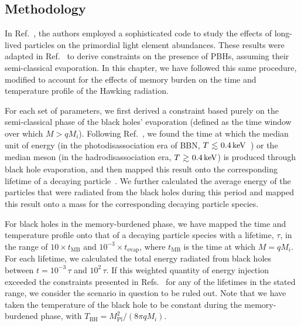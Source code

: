 \begin{subappendices}

\section{Methodology}
\label{sec:ch10-app-methodology}

In Ref.~\cite{Kawasaki:2017bqm}, the authors employed a sophisticated code to study the effects of long-lived particles on the primordial light element abundances. These results were adapted in Ref.~\cite{Keith:2020jww} to derive constraints on the presence of PBHs, assuming their semi-classical evaporation.  In this chapter, we have followed this same procedure, modified to account for the effects of memory burden on the time and temperature profile of the Hawking radiation.

For each set of parameters, we first derived a constraint based purely on the semi-classical phase of the black holes' evaporation (defined as the time window over which $M > q M_{i}$). Following Ref.~\cite{Keith:2020jww}, we found the time at which the median unit of energy (in the photodisassociation era of BBN, $T \lsim 0.4\,\mathrm{keV}$~\cite{Kawasaki:1994af}) or the median meson (in the hadrodisassociation era, $T \gsim 0.4\,\mathrm{keV}$) is produced through black hole evaporation, and then mapped this result onto the corresponding lifetime of a decaying particle~\cite{Kawasaki:1994af}. We further calculated the average energy of the particles that were radiated from the black holes during this period and mapped this result onto a mass for the corresponding decaying particle species.

For black holes in the memory-burdened phase, we have mapped the time and temperature profile onto that of a decaying particle species with a lifetime, $\tau$, in the range of $10 \times t_\mathrm{MB}$ and $10^{-3} \times t_\mathrm{evap}$, where $t_\mathrm{MB}$ is the time at which $M=q M_{i}$. For each lifetime, we calculated the total energy radiated from black holes between $t= 10^{-3}\,\tau$ and $10^{2}\,\tau$. If this weighted quantity of energy injection exceeded the constraints presented in Refs.~\cite{Keith:2020jww, Kawasaki:2017bqm} for any of the lifetimes in the stated range, we consider the scenario in question to be ruled out. Note that we have taken the temperature of the black hole to be constant during the memory-burdened phase, with $T_\mathrm{BH} = M^{2}_\mathrm{Pl}/(8 \pi q M_{i})$.


\end{subappendices}
